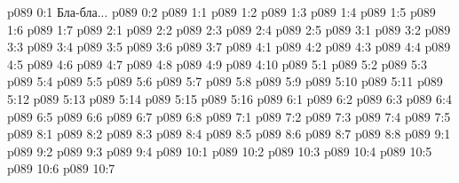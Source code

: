 \author{Яркая Вечерняя Звезда}
\vs p089 0:1  Бла-бла...
\vs p089 0:2 
\vs p089 1:1 
\vs p089 1:2 
\vs p089 1:3 
\vs p089 1:4 
\vs p089 1:5 
\vs p089 1:6 
\vs p089 1:7 
\vs p089 2:1 
\vs p089 2:2 
\vs p089 2:3 
\vs p089 2:4 
\vs p089 2:5 
\vs p089 3:1 
\vs p089 3:2 
\vs p089 3:3 
\vs p089 3:4 
\vs p089 3:5 
\vs p089 3:6 \pc 
\vs p089 3:7 \pc 
{}
\vs p089 4:1 
\vs p089 4:2 
\vs p089 4:3 
\vs p089 4:4 \pc 
\vs p089 4:5 
\vs p089 4:6 
\vs p089 4:7 \pc 
\vs p089 4:8 \pc 
\vs p089 4:9 
\vs p089 4:10 
\vs p089 5:1 
\vs p089 5:2 
\vs p089 5:3 
\vs p089 5:4 
\vs p089 5:5 
\vs p089 5:6 
\vs p089 5:7 
\vs p089 5:8 \pc 
\vs p089 5:9 
\vs p089 5:10 
\vs p089 5:11 
\vs p089 5:12 
\vs p089 5:13 
\vs p089 5:14 
\vs p089 5:15 
\vs p089 5:16 \pc 
{}
\vs p089 6:1 
\vs p089 6:2 
\vs p089 6:3 \pc 
\vs p089 6:4 \pc 
\vs p089 6:5 
\vs p089 6:6 
\vs p089 6:7 \pc 
\vs p089 6:8 
\vs p089 7:1 
\vs p089 7:2 
\vs p089 7:3 
\vs p089 7:4 \pc 
\vs p089 7:5 
\vs p089 8:1 
\vs p089 8:2 
\vs p089 8:3 
\vs p089 8:4 \pc 
\vs p089 8:5 
\vs p089 8:6 
\vs p089 8:7 \pc 
\vs p089 8:8 
\vs p089 9:1 
\vs p089 9:2 
\vs p089 9:3 
\vs p089 9:4 
\vs p089 10:1 
\vs p089 10:2 \pc 
\vs p089 10:3 \pc 
\vs p089 10:4 
\vs p089 10:5 
\vs p089 10:6 
\vsetoff
\vs p089 10:7 
\quizlink
